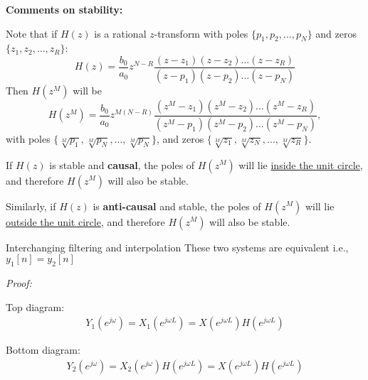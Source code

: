 \documentclass[10pt, aspectratio=169]{beamer}
\begin{document}
\begin{frame}
\textbf{Comments on stability:}

Note that if $H(z)$ is a rational $z$-transform with poles $\{p_1, p_2, \ldots, p_N\}$ and zeros $\{z_1, z_2, \ldots, z_R\}$:
\begin{equation*}
H(z) = \frac{b_0}{a_0}z^{N-R}\frac{(z-z_1)(z-z_2)\ldots(z-z_R)}{(z-p_1)(z-p_2)\ldots(z-p_N)}
\end{equation*}
Then $H(z^M)$ will be
\begin{equation*}
H(z^M) = \frac{b_0}{a_0}z^{M(N-R)}\frac{(z^M-z_1)(z^M-z_2)\ldots(z^M-z_R)}{(z^M-p_1)(z^M-p_2)\ldots(z^M-p_N)},
\end{equation*}
with poles $\{\sqrt[M]{p_1}, \sqrt[M]{p_N}, \ldots, \sqrt[M]{p_N}\}$, and zeros $\{\sqrt[M]{z_1}, \sqrt[M]{z_N}, \ldots, \sqrt[M]{z_R}\}$.
 
If $H(z)$ is stable and \textbf{causal}, the poles of $H(z^M)$ will lie \underline{inside the unit circle}, and therefore $H(z^M)$ will also be stable.

Similarly, if $H(z)$ is \textbf{anti-causal} and stable, the poles of $H(z^M)$ will lie \underline{outside the unit circle}, and therefore $H(z^M)$ will also be stable.

\end{frame}


\begin{frame}{Interchanging filtering and interpolation}
	These two systems are equivalent i.e., $y_1[n] = y_2[n]$
	\begin{center}
		\resizebox{0.5\linewidth}{!}{}
	\end{center}	
	\textit{Proof:}
	
	Top diagram:
	\begin{align*}
	Y_1(e^{j\omega}) = X_1(e^{j\omega L}) = X(e^{j\omega L})H(e^{j\omega L}) 
	\end{align*}
	
	Bottom diagram:
	\begin{align*}
	Y_2(e^{j\omega}) = X_2(e^{j\omega})H(e^{j\omega L}) = X(e^{j\omega L})H(e^{j\omega L}) 
	\end{align*}
\end{frame}
\end{document}
